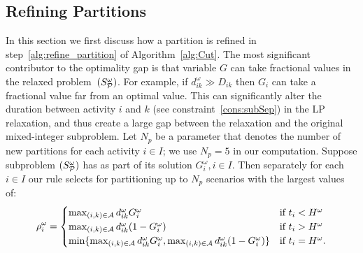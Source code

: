 \documentclass[11pt]{article}
\newcommand{\cA}{{\cal A}}
\newcommand{\cP}{{\cal P}}
\begin{document}
	\subsection{Refining Partitions}\label{subsec:refine} 
	In this section we first discuss how a partition is refined in step~\ref{alg:refine_partition} of Algorithm~\ref{alg:Cut}. 
	The most significant contributor to the optimality gap is that variable \(G\) can take fractional values in the relaxed problem~\((S_{\cP}^\omega)\). For example, if \(d_{ik}^\omega \gg D_{ik}\) then \(G_i\) can take a fractional value far from an optimal value.
	This can significantly alter the duration between activity \(i\) and \(k\) (see constraint~\eqref{cons:subSep}) in the LP relaxation, and thus create a large gap between the relaxation and the original mixed-integer subproblem. Let \(N_p\) be a parameter that denotes the number of new partitions for each activity \(i \in I\); we use $N_p=5$ in our computation. Suppose subproblem \((S_\cP^\omega)\) has as part of its solution \({G}_i^\omega, i \in I \). 
	Then separately for each $i \in I$ our rule selects for partitioning up to \(N_p\) scenarios with the largest values of:
	\begin{align}\label{eqn:define_rho}
	\rho_{i}^{{\omega}} = \begin{cases}
	\max_{(i,k) \in \cA} d_{ik}^{{\omega}} {G}_i^\omega & \text{if } t_i < H^{{\omega}}\\
	\max_{(i,k) \in \cA} d_{ik}^{{\omega}} (1 - {G}_i^\omega) & \text{if } t_i > H^{{\omega}}\\
	\min\{\max_{(i,k) \in \cA} d_{ik}^{{\omega}} {G}_i^\omega, \max_{(i,k) \in \cA} d_{ik}^{{\omega}} (1 - {G}_i^\omega)\} & \text{if $t_i=H^{\omega}$.}
	\end{cases}
	\end{align}
	
\end{document}
